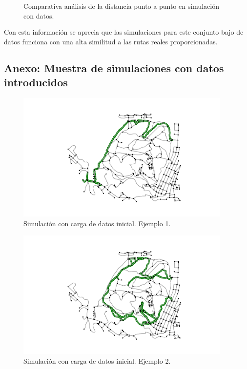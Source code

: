 \begin{figure}[!htb]
\begin{minipage}{0.48\textwidth}
\caption{Comparativa análisis de la distancia punto a punto en simulación con datos.}
\label{figure:ComparativaEmpty}
\end{minipage}
\end{figure}
\newpage

Con esta información se aprecia que las simulaciones para este conjunto bajo de datos funciona con una alta similitud a las rutas reales proporcionadas.

\newpage
\newpage
\subsection{Anexo: Muestra de simulaciones con datos introducidos} \label{subseciton:SimulationSample}\begin{figure}[h]
\begin{center}
\includegraphics[width=0.95\textwidth]{./Imagenes/data-simulation/track1.png}
\caption{Simulación con carga de datos inicial. Ejemplo 1.}
\end{center}
\label{figure:Simulation1}
\end{figure}

\begin{figure}[h]
\begin{center}
\includegraphics[width=0.95\textwidth]{./Imagenes/data-simulation/track2.png}
\caption{Simulación con carga de datos inicial. Ejemplo 2.}
\end{center}
\label{figure:Simulation2}
\end{figure}

